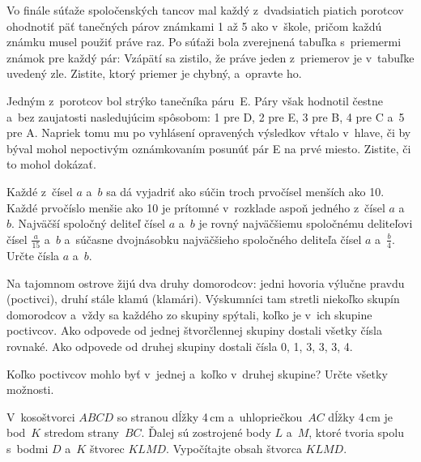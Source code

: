 {%
Vo finále súťaže spoločenských tancov mal každý z~dvadsiatich piatich porotcov ohodnotiť päť tanečných párov známkami 1 až 5 ako v~škole, pričom každú známku musel použiť práve raz. Po súťaži bola zverejnená tabuľka s~priemermi známok pre každý pár:
Vzápätí sa zistilo, že práve jeden z~priemerov je v~tabuľke uvedený zle. Zistite, ktorý priemer je chybný, a~opravte ho.

Jedným z~porotcov bol strýko tanečníka páru~E. Páry však hodnotil čestne a~bez zaujatosti nasledujúcim spôsobom: 1 pre D, 2 pre E, 3 pre B, 4 pre C a~5 pre A. Napriek tomu mu po vyhlásení opravených výsledkov vŕtalo v~hlave, či by býval mohol nepoctivým oznámkovaním posunúť pár E na prvé miesto. Zistite, či to mohol dokázať.}

{%
Každé z~čísel $a$ a~$b$ sa dá vyjadriť ako súčin troch prvočísel menších ako 10. Každé prvočíslo menšie ako 10 je prítomné v~rozklade aspoň jedného z~čísel $a$ a~$b$. Najväčší spoločný deliteľ čísel $a$ a~$b$ je rovný najväčšiemu spoločnému deliteľovi čísel $\frac{a}{15}$ a~$b$ a~súčasne
dvojnásobku najväčšieho spoločného deliteľa čísel $a$ a~$\frac{b}4$. Určte čísla $a$ a~$b$.}

{%
Na tajomnom ostrove žijú dva druhy domorodcov: jedni hovoria výlučne pravdu (poctivci), druhí stále klamú (klamári). Výskumníci tam stretli niekoľko skupín domorodcov a~vždy sa každého zo skupiny spýtali, koľko je v~ich skupine poctivcov.
\itemitem{$\bullet$} Ako odpovede od jednej štvorčlennej skupiny dostali všetky čísla rovnaké. %
\itemitem{$\bullet$} Ako odpovede od druhej skupiny dostali čísla 0, 1, 3, 3, 3, 4.

Koľko poctivcov mohlo byť v~jednej a~koľko v~druhej skupine? Určte všetky možnosti.}

{%
V~kosoštvorci $ABCD$ so stranou dĺžky 4\,cm a~uhlopriečkou~$AC$ dĺžky 4\,cm je bod~$K$ stredom strany~$BC$. Ďalej sú zostrojené body $L$ a~$M$, ktoré tvoria spolu s~bodmi $D$ a~$K$ štvorec $KLMD$. Vypočítajte obsah štvorca $KLMD$.}

